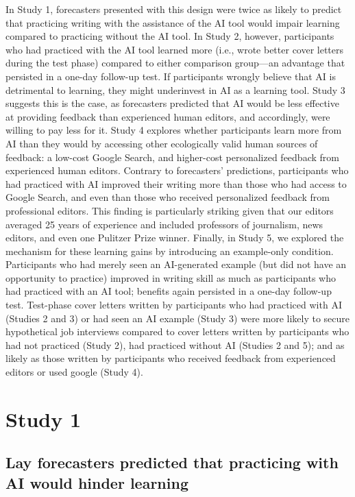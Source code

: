 \documentclass[11pt]{report}
\begin{document}
\begin{mainf}
In Study 1, forecasters presented with this design were twice as likely to predict that practicing writing with the assistance of the AI tool would impair learning compared to practicing without the AI tool. 
In Study 2, however, participants who had practiced with the AI tool learned more (i.e., wrote better cover letters during the test phase) compared to either comparison group---an advantage that persisted in a one-day follow-up test. 
If participants wrongly believe that AI is detrimental to learning, they might underinvest in AI as a learning tool. Study 3 suggests this is the case, as forecasters predicted that AI would be less effective at providing feedback than experienced human editors, and accordingly, were willing to pay less for it. 
Study 4 explores whether participants learn more from AI than they would by accessing other ecologically valid human sources of feedback: a low-cost Google Search, and higher-cost personalized feedback from experienced human editors. Contrary to forecasters' predictions, participants who had practiced with AI improved their writing more than those who had access to Google Search, and even than those who received personalized feedback from professional editors. This finding is particularly striking given that our editors averaged 25 years of experience and included professors of journalism, news editors, and even one Pulitzer Prize winner.
Finally, in Study 5, we explored the mechanism for these learning gains by introducing an example-only condition. 
Participants who had merely seen an AI-generated example (but did not have an opportunity to practice) improved in writing skill as much as participants who had practiced with an AI tool; benefits again persisted in a one-day follow-up test. 
Test-phase cover letters written by participants who had practiced with AI (Studies 2 and 3) or had seen an AI example (Study 3) were more likely to secure hypothetical job interviews compared to cover letters written by participants who had not practiced (Study 2), had practiced without AI (Studies 2 and 5); and as likely as those written by participants who received feedback from experienced editors or used google (Study 4).

\section*{Study 1} 
\subsection*{Lay forecasters predicted that practicing with AI would hinder learning}


\end{mainf}
\end{document}
